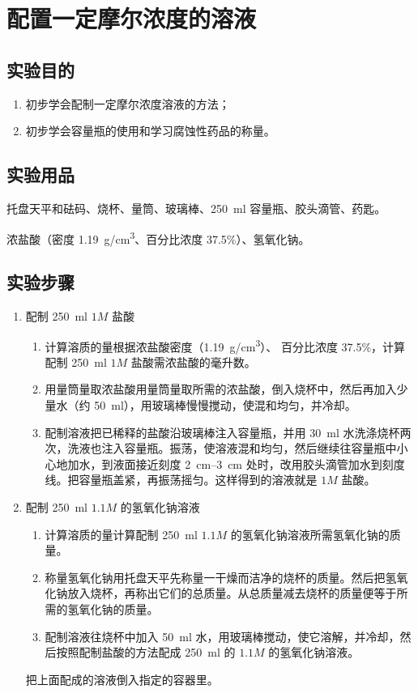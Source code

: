 \section{配置一定摩尔浓度的溶液}
\subsection*{实验目的}
\begin{enumerate}[1.]
  \item 初步学会配制一定摩尔浓度溶液的方法；
  \item 初步学会容量瓶的使用和学习腐蚀性药品的称量。
\end{enumerate}

\subsection*{实验用品}
托盘天平和砝码、烧杯、量筒、玻璃棒、\qty{250}{ml} 容量瓶、胶头滴管、药匙。

浓盐酸（密度 \qty{1.19}{g/cm^3}、百分比浓度 37.5\%）、氢氧化钠。
\subsection*{实验步骤}
\begin{enumerate}[1.]
  \item 配制 \qty{250}{ml} $1M$ 盐酸
  \begin{enumerate}[(1)]
    \item 计算溶质的量\quad 根据浓盐酸密度（\qty{1.19}{g/cm^3}）、 百分比浓度 37.5\%，计算配制 \qty{250}{ml} $1M$ 盐酸需浓盐酸的毫升数。
    \item 用量筒量取浓盐酸\quad 用量筒量取所需的浓盐酸，倒入烧杯中，然后再加入少量水（约 \qty{50}{ml}），用玻璃棒慢慢搅动，使混和均匀，并冷却。
    \item 配制溶液\quad 把已稀释的盐酸沿玻璃棒注入容量瓶，并用 \qty{30}{ml} 水洗涤烧杯两次，洗液也注入容量瓶。振荡，使溶液混和均匀，然后继续往容量瓶中小心地加水，到液面接近刻度 \qtyrange{2}{3}{cm} 处时，改用胶头滴管加水到刻度线。把容量瓶盖紧，再振荡摇匀。这样得到的溶液就是 $1M$ 盐酸。
  \end{enumerate}
  \item 配制 \qty{250}{ml} $1.1M$ 的氢氧化钠溶液
  \begin{enumerate}[(1)]
    \item 计算溶质的量\quad 计算配制 \qty{250}{ml} $1.1M$ 的氢氧化钠溶液所需氢氧化钠的质量。
    \item 称量氢氧化钠\quad 用托盘天平先称量一干燥而洁净的烧杯的质量。然后把氢氧化钠放入烧杯，再称出它们的总质量。从总质量减去烧杯的质量便等于所需的氢氧化钠的质量。
    \item 配制溶液\quad 往烧杯中加入 \qty{50}{ml} 水，用玻璃棒搅动，使它溶解，并冷却，然后按照配制盐酸的方法配成 \qty{250}{ml} 的 $1.1M$ 的氢氧化钠溶液。
  \end{enumerate}
  把上面配成的溶液倒入指定的容器里。 
\end{enumerate}

